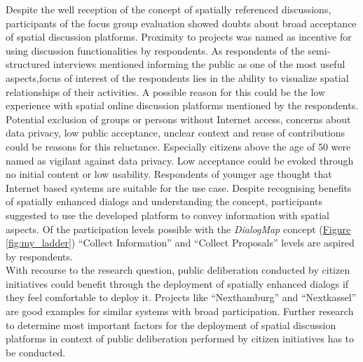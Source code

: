 Despite the well reception of the concept of spatially referenced discussions, participants of the focus group evaluation showed doubts about broad acceptance of spatial discussion platforms.  Proximity to projects was named as incentive for using discussion functionalities by respondents. As respondents of the semi-structured interviews mentioned informing the public as one of the most useful aspects,focus of interest of the respondents lies in the ability to visualize spatial relationships of their activities. A possible reason for this could be the low experience with spatial online discussion platforms mentioned by the respondents. \\
Potential exclusion of groups or persons without Internet access, concerns about data privacy, low public acceptance, unclear context and reuse of contributions could be reasons for this reluctance. Especially citizens above the age of 50 were named as vigilant against data privacy. Low acceptance could be evoked through no initial content or low usability. Respondents of younger age thought that Internet based systems are suitable for the use case. Despite recognising benefits of spatially enhanced dialogs and understanding the concept, participants suggested to use the developed platform to convey information with spatial aspects. Of the participation levels possible with the \textit{DialogMap} concept (\hyperref[fig:my_ladder]{Figure \ref{fig:my_ladder}}) ``Collect Information'' and ``Collect Proposals'' levels are aspired by respondents.\\
With recourse to the research question, public deliberation conducted by citizen initiatives could benefit through the deployment of spatially enhanced dialogs if they feel comfortable to deploy it. Projects like ``Nexthamburg'' and ``Nextkassel'' are good examples for similar systems with broad participation. Further research to determine most important factors for the deployment of spatial discussion platforms in context of public deliberation performed by citizen initiatives has to be conducted.



